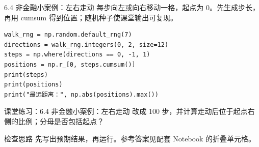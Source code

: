 \begin{frame}[fragile]{6.4 非金融小案例：左右走动}
\small 每步向左或向右移动一格，起点为 0。先生成步长，再用 cumsum 得到位置；随机种子使课堂输出可复现。
\medskip
\begin{lstlisting}
walk_rng = np.random.default_rng(7)
directions = walk_rng.integers(0, 2, size=12)
steps = np.where(directions == 0, -1, 1)
positions = np.r_[0, steps.cumsum()]
print(steps)
print(positions)
print("最远距离：", np.abs(positions).max())
\end{lstlisting}
\end{frame}
\begin{frame}[fragile]{课堂练习：6.4 非金融小案例：左右走动}
改成 100 步，并计算走动后位于起点右侧的比例；分母是否包括起点？
\medskip
\begin{block}{检查思路}
先写出预期结果，再运行。参考答案见配套 Notebook 的折叠单元格。
\end{block}
\end{frame}
